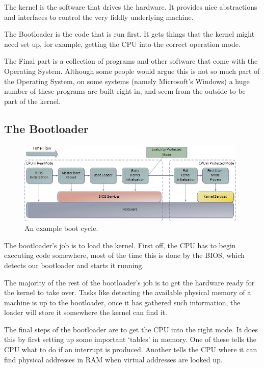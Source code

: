 \documentclass[a4paper]{report}
\begin{document}
The kernel is the software that drives the hardware. It provides nice abstractions and interfaces to control the very fiddly underlying machine.

The Bootloader is the code that is run first. It gets things that the kernel might need set up, for example, getting the CPU into the correct operation mode.

The Final part is a collection of programs and other software that come with the Operating System. Although some people would argue this is not so much part of the Operating System, on some systems (namely Microsoft's Windows) a huge number of these programs are built right in, and seem from the outside to be part of the kernel.

\subsection{The Bootloader}

\begin{figure}[ht]
\centering
\includegraphics[width=415px]{images/bootProcess.png}
\caption{An example boot cycle.}
\label{fig:theloader}
\end{figure}

The bootloader's job is to load the kernel. First off, the CPU has to begin executing code somewhere, most of the time this is done by the BIOS, which detects our bootloader and starts it running.

The majority of the rest of the bootloader's job is to get the hardware ready for the kernel to take over. Tasks like detecting the available physical memory of a machine is up to the bootloader, once it has gathered such information, the loader will store it somewhere the kernel can find it.

The final steps of the bootloader are to get the CPU into the right mode. It does this by first setting up some important `tables' in memory. One of these tells the CPU what to do if an interrupt is produced. Another tells the CPU where it can find physical addresses in RAM when virtual addresses are looked up.
\end{document}
